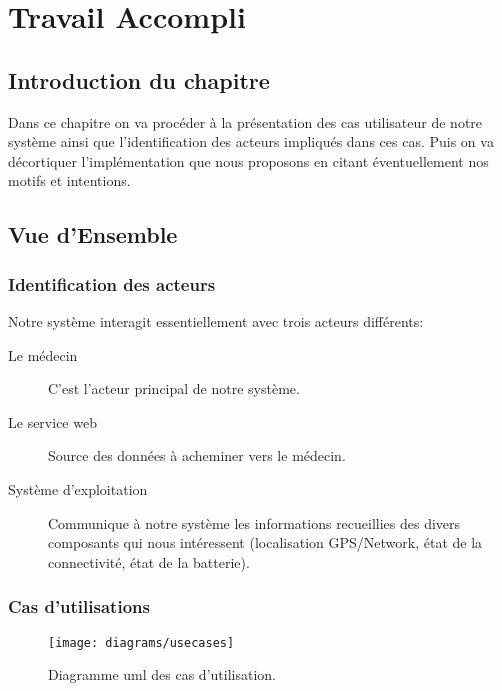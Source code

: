 
\chapter{Travail Accompli}

\section{Introduction du chapitre}

Dans ce chapitre on va procéder à la présentation des cas utilisateur de
notre système ainsi que l'identification des acteurs impliqués dans ces
cas. Puis on va décortiquer l’implémentation que nous proposons en citant
éventuellement nos motifs et intentions.

\section{Vue d'Ensemble}

\subsection{Identification des acteurs}

Notre système interagit essentiellement avec trois acteurs différents:

\begin{description}
\item[Le médecin] C'est l'acteur principal de notre système.

\item[Le service web] Source des données à acheminer vers le médecin.

\item[Système d'exploitation] Communique à notre système les
informations recueillies des divers composants qui nous intéressent
(localisation GPS/Network, état de la connectivité, état de la
batterie).

\end{description}

\subsection{Cas d'utilisations}

\begin{figure}
\center
\texttt{[image: diagrams/usecases]}
\caption{Diagramme \gls{uml} des cas d'utilisation.}
\label{fig:usecase}
\end{figure}


